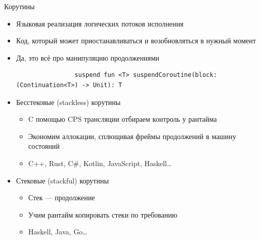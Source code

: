     \begin{frame}[fragile]{Корутины}
        \begin{itemize}
            \item Языковая реализация логических потоков исполнения
            \item Код, который может приостанавливаться и возобновляться в нужный момент
            \item Да, это всё про манипуляцию продолжениями
            \begin{verbatim}
                suspend fun <T> suspendCoroutine(block: (Continuation<T>) -> Unit): T
            \end{verbatim}
            \item Бесстековые (stackless) корутины
            \begin{itemize}
                \item C помощью CPS трансляции отбираем контроль у рантайма
                \item Экономим аллокации, сплющивая фреймы продолжений в машину состояний
                \item C++, Rust, C\#, Kotlin, JavaScript, Haskell\ldots
            \end{itemize}
            \item Стековые (stackful) корутины
            \begin{itemize}
                \item Стек --- продолжение
                \item Учим рантайм копировать стеки по требованию
                \item Haskell, Java, Go\ldots
            \end{itemize}
        \end{itemize}
    \end{frame}


